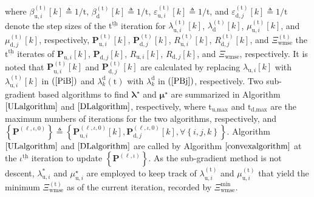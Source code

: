 \documentclass[9pt,journal]{IEEEtran}
\newcommand{\paren}[1]{\left({#1}\right)}
\newcommand{\bracket}[1]{{\left [{#1}\right ]}}
\newcommand{\braces}[1]{{\left\{ {#1}\right\}}}
\newcommand{\ith}[1]    {{#1}^{\underline{\text{th}}}}
\newcommand{\PiB}{\mathbf{P}_{\textrm{u},i}\bracket{k}}
\newcommand{\PBj}{\mathbf{P}_{\textrm{d},j}\bracket{k}}
\newcommand{\sfrac}[2]{#1/#2}
\begin{document}
where $\beta^{\paren{\mathrm{t}}}_{\textrm{u},i}\bracket{k}\triangleq\sfrac{1}{\mathrm{t}}$, $\beta^{\paren{\mathrm{t}}}_{\textrm{d}}\bracket{k}\triangleq\sfrac{1}{\mathrm{t}}$, $\varepsilon^{\paren{\mathrm{t}}}_{\textrm{u},i}\bracket{k}\triangleq\sfrac{1}{\mathrm{t}}$, and $\varepsilon^{\paren{\mathrm{t}}}_{\textrm{d},j}\bracket{k}\triangleq\sfrac{1}{\mathrm{t}}$ denote the step sizes of the $\ith{\mathrm{t}}$ iteration for $\lambda^{\paren{\mathrm{t}}}_{\textrm{u},i}\bracket{k}$, $\lambda^{\paren{\mathrm{t}}}_{\textrm{d}}\bracket{k}$, $\mu^{\paren{\mathrm{t}}}_{\textrm{u},i}\bracket{k}$, and $\mu^{\paren{\mathrm{t}}}_{\textrm{d},j}\bracket{k}$, respectively, $\mathbf{P}^{\paren{\mathrm{t}}}_{\textrm{u},i}\bracket{k}$, $\mathbf{P}^{\paren{\mathrm{t}}}_{\textrm{d},j}\bracket{k}$, $\mathit{R}^{\paren{\mathrm{t}}}_{\textrm{u},i}\bracket{k}$, $\mathit{R}^{\paren{\mathrm{t}}}_{\textrm{d},j}\bracket{k}$, and $\Xi^{\paren{\mathrm{t}}}_{\textrm{wmse}}$ the $\ith{\mathrm{t}}$ iterates of $\PiB$, $\PBj$, $\mathit{R}_{\textrm{u},i}\bracket{k}$, $\mathit{R}_{\textrm{d},j}\bracket{k}$, and $\Xi_{\textrm{wmse}}$, respectively. It is noted that $\mathbf{P}^{\paren{\mathrm{t}}}_{\textrm{u},i}\bracket{k}$ and $\mathbf{P}^{\paren{\mathrm{t}}}_{\textrm{d},j}\bracket{k}$ are calculated by replacing $\lambda_{\textrm{u},i}\bracket{k}$ with $\lambda^{\paren{\mathrm{t}}}_{\textrm{u},i}\bracket{k}$ in $\paren{\mathrm{\ref{PiB}}}$ and $\lambda^{\textrm{d}}_{k}\paren{\mathrm{t}}$ with $\lambda^{\textrm{d}}_{k}$ in $\paren{\mathrm{\ref{PBj}}}$, respectively. %
Two sub-gradient based algorithms to find $\boldsymbol{\lambda}^\star$ and $\boldsymbol{\mu}^\star$ are summarized in Algorithm $\ref{ULalgorithm}$ and $\ref{DLalgorithm}$, respectively, where $\mathrm{t}_{\textrm{u,max}}$ and $\mathrm{t}_{\textrm{d,max}}$ are the maximum numbers of iterations for the two algorithms, respectively, and $\braces{\mathbf{P}^{\paren{\ell,\iota,0}}}\triangleq\braces{\mathbf{P}^{\paren{\ell,\iota,0}}_{\textrm{u},i}\bracket{k},\mathbf{P}^{\paren{\ell,\iota,0}}_{\textrm{d},j}\bracket{k},\forall \braces{i,j,k}}$. Algorithm $\ref{ULalgorithm}$ and $\ref{DLalgorithm}$ are called by Algorithm $\ref{convexalgorithm}$ at the $\ith{\iota}$ iteration to update $\braces{\mathbf{P}^{\paren{\ell,\iota}}}$. As the sub-gradient method is not descent, $\lambda^{\ast}_{\textrm{u},i}$ and $\mu^\star_{\textrm{u},i}$ are employed to keep track of $\lambda^{\paren{\mathrm{t}}}_{\textrm{u},i}$ and $\mu^{\paren{\mathrm{t}}}_{\textrm{u},i}$ that yield the minimum $\Xi^{\paren{\mathrm{t}}}_{\textrm{wmse}}$ as of the current iteration, recorded by $\Xi^{\textrm{min}}_{\textrm{wmse}}$. 
\end{document}
